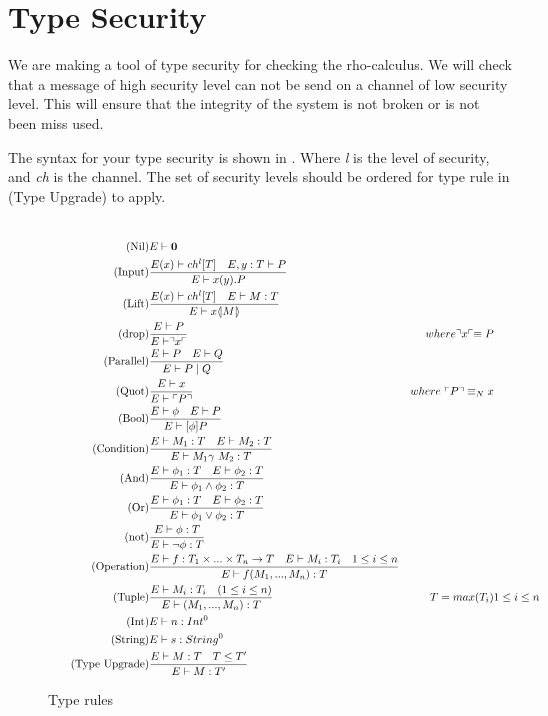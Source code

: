 \section{Type Security}
We are making a tool of type security for checking the rho-calculus.
We will check that a message of high security level can not be send on a channel of low security level.
This will ensure that the integrity of the system is not broken or is not been miss used.


The syntax for your type security is shown in . Where \textit{l} is the level of security, and \textit{ch} is the channel. The set of security levels should be ordered for type rule in  (Type Upgrade) to apply.\\\\


\begin{figure}
\begin{align}
\tag{Nil} &E \vdash \mathbf{0}\\
\tag{Input} &\frac{E(x) \vdash ch^l[T]\quad E,y:T\vdash P}{E \vdash x(y).P}\\
\tag{Lift} &\frac{E(x) \vdash ch^l[T] \quad E \vdash M:T}{E\vdash x \langle \! | M | \! \rangle}\\
\tag{drop} &\frac{E \vdash P}{E\vdash \urcorner x \ulcorner}& where \urcorner x \ulcorner \equiv P\\
\tag{Parallel} &\frac{E\vdash P \quad E \vdash Q}{E \vdash P \mid Q}\\
\tag{Quot} &\frac{E \vdash x}{E\vdash \ulcorner P \urcorner}& where\ \ulcorner P \urcorner \equiv_N x\\
\tag{Bool} &\frac{E\vdash \phi \quad E\vdash P}{E \vdash [\phi] P}\\
\tag{Condition} &\frac{E\vdash M_1:T \quad E\vdash M_2:T}{E\vdash M_1 \gamma\ M_2:T}\\
\tag{And} &\frac{E\vdash \phi _1:T \quad E\vdash \phi _2:T}{E\vdash \phi _1 \land \phi _2:T}\\
\tag{Or} &\frac{E\vdash \phi _1:T \quad E\vdash \phi _2:T}{E\vdash \phi _1 \lor \phi _2:T}\\
\tag{not} &\frac{E\vdash \phi :T }{E\vdash \neg \phi :T}\\
\tag{Operation} &\frac{E\vdash f:T_1\times ... \times T_n\rightarrow T\quad E\vdash M_i:T_i\quad 1\leq i \leq n}{E\vdash f(M_1,...,M_n):T}\\
\tag{Tuple} &\frac{E\vdash M_i:T_i \quad (1\leq i\leq n)}{E\vdash (M_1,...,M_n):T}&T = max(T_i)& 1\leq i\leq n\\
\tag{Int} &E\vdash n: Int^0\\
\tag{String} &E\vdash s:String^0\\
\tag{Type Upgrade} &\frac{E\vdash M:T \quad T\leq T'}{E\vdash M:T'}
\end{align}
\caption{Type rules}
\label{fig:typerules}
\end{figure}

